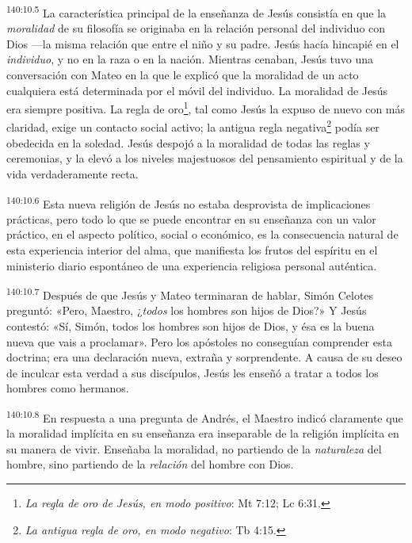 \par
\textsuperscript{140:10.5} La característica principal de la enseñanza de Jesús consistía en que la \textit{moralidad} de su filosofía se originaba en la relación personal del individuo con Dios ---la misma relación que entre el niño y su padre. Jesús hacía hincapié en el \textit{individuo}, y no en la raza o en la nación. Mientras cenaban, Jesús tuvo una conversación con Mateo en la que le explicó que la moralidad de un acto cualquiera está determinada por el móvil del individuo. La moralidad de Jesús era siempre positiva. La regla de oro\footnote{\textit{La regla de oro de Jesús, en modo positivo}: Mt 7:12; Lc 6:31.}, tal como Jesús la expuso de nuevo con más claridad, exige un contacto social activo; la antigua regla negativa\footnote{\textit{La antigua regla de oro, en modo negativo}: Tb 4:15.} podía ser obedecida en la soledad. Jesús despojó a la moralidad de todas las reglas y ceremonias, y la elevó a los niveles majestuosos del pensamiento espiritual y de la vida verdaderamente recta.

\par
\textsuperscript{140:10.6} Esta nueva religión de Jesús no estaba desprovista de implicaciones prácticas, pero todo lo que se puede encontrar en su enseñanza con un valor práctico, en el aspecto político, social o económico, es la consecuencia natural de esta experiencia interior del alma, que manifiesta los frutos del espíritu en el ministerio diario espontáneo de una experiencia religiosa personal auténtica.

\par
\textsuperscript{140:10.7} Después de que Jesús y Mateo terminaran de hablar, Simón Celotes preguntó: «Pero, Maestro, ¿\textit{todos} los hombres son hijos de Dios?» Y Jesús contestó: «Sí, Simón, todos los hombres son hijos de Dios, y ésa es la buena nueva que vais a proclamar». Pero los apóstoles no conseguían comprender esta doctrina; era una declaración nueva, extraña y sorprendente. A causa de su deseo de inculcar esta verdad a sus discípulos, Jesús les enseñó a tratar a todos los hombres como hermanos.

\par
\textsuperscript{140:10.8} En respuesta a una pregunta de Andrés, el Maestro indicó claramente que la moralidad implícita en su enseñanza era inseparable de la religión implícita en su manera de vivir. Enseñaba la moralidad, no partiendo de la \textit{naturaleza} del hombre, sino partiendo de la \textit{relación} del hombre con Dios.

